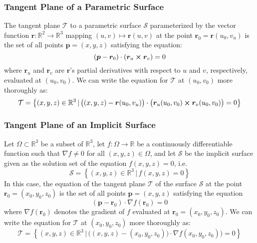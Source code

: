 \documentclass[11pt, a4paper]{article}
\begin{document}
\subsubsection{Tangent Plane of a Parametric Surface}
The tangent plane $ \mathcal{T} $ to a parametric surface $ \mathcal{S} $ parameterized by the vector function $ \bm{r} : \mathbb{R}^2 \rightarrow \mathbb{R}^3 $ mapping $ (u, v) \mapsto \bm{r}(u, v) $ at the point $ \bm{r}_0 = \bm{r}(u_0, v_u)$ is the set of all points $ \bm{p} = (x, y, z) $ satisfying the equation:
\begin{equation*}
	\left(\bm{p} - \bm{r}_0 \right) \cdot (\bm{r}_u \cross \bm{r}_v) = 0
\end{equation*}
where $ \bm{r}_u $ and $ \bm{r}_v $ are $ \bm{r} $'s partial derivatives with respect to $ u $ and $ v $, respectively, evaluated at $ (u_0, v_0) $. We can write the equation for $ \mathcal{T} $ at $ (u_0, v_0) $ more thoroughly as:
\begin{equation*}
	\mathcal{T} = \left\{ (x, y, z) \in \mathbb{R}^3 \, | \, \big((x, y, z) -  \bm{r}(u_0, v_u)\big) \cdot \big(\bm{r}_u(u_0, v_0) \cross \bm{r}_v(u_0, v_0)  \big) = 0 \right \}
\end{equation*}

\subsubsection{Tangent Plane of an Implicit Surface}
Let $ \Omega \subset \mathbb{R}^3$ be a subset of $ \mathbb{R}^3 $, let $ f : \Omega \rightarrow \mathbb{R} $ be a continuously differentiable function such that $ \nabla f \neq 0 $ for all $ (x, y, z) \in \Omega $, and let $ \mathcal{S} $ be the implicit surface given as the solution set of the equation $ f(x, y, z) = 0 $, i.e.
\begin{equation*}
	\mathcal{S} = \left\{ (x, y, z) \in \mathbb{R}^3 \, | \, f(x, y, z) = 0 \right\}
\end{equation*}
In this case, the equation of the tangent plane $ \mathcal{T} $ of the surface $ \mathcal{S} $ at the point $ \bm{r}_0 = (x_0, y_0, z_0) $ is the set of all points $ \bm{p} = (x, y, z) $ satisfying the equation
\begin{equation*}
	\left(\bm{p} - \bm{r}_0 \right) \cdot \nabla f(\bm{r}_0) = 0
\end{equation*} 
where $ \nabla f(\bm{r}_0) $ denotes the gradient of $ f $ evaluated at $ \bm{r}_0 = (x_0, y_0, z_0) $. We can write the equation for $ \mathcal{T} $ at $ (x_0, y_0, z_0) $ more thoroughly as:
\begin{equation*}
	\mathcal{T} = \left\{ (x, y, z) \in \mathbb{R}^3 \, | \, \big((x, y, z) -  (x_0, y_0, z_0) \big) \cdot \nabla f(x_0, y_0, z_0) \big) = 0 \right \}
\end{equation*}
\end{document}
